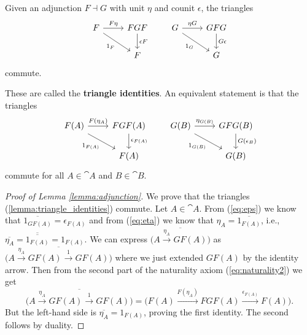 \begin{lemma}\label{lemma:adjunction}
    Given an adjunction $F\dashv G$ with unit $\eta$ and counit $\epsilon$, the triangles
    \begin{equation*}
    \begin{tikzcd}
        F \arrow[r, "F\eta"] \arrow[dr, "1_F"'] & FGF \arrow[d, "\epsilon F"] \\
        & F
    \end{tikzcd}
    \qquad
    \begin{tikzcd}
        G \arrow[r, "\eta G"] \arrow[dr, "1_G"'] & GFG \arrow[d, "G\epsilon"] \\
        & G
    \end{tikzcd}
    \end{equation*}
    commute.
\end{lemma}
\begin{remark}
    These are called the \textbf{triangle identities}. An equivalent statement is that the triangles
    \begin{equation}\label{lemma:triangle_identities}
    \begin{tikzcd}
        F(A) \arrow[r, "F(\eta_A)"] \arrow[dr, "1_{F(A)}"'] & FGF(A) \arrow[d, "\epsilon_{F(A)}"] \\
        & F(A)
    \end{tikzcd}
    \qquad
    \begin{tikzcd}
        G(B) \arrow[r, "\eta_{G(B)}"] \arrow[dr, "1_{G(B)}"'] & GFG(B) \arrow[d, "G(\epsilon_B)"] \\
        & G(B)
    \end{tikzcd}
    \end{equation}
    commute for all $A\in\cat{A}$ and $B\in\cat{B}$.
\end{remark}
\begin{proof}[Proof of Lemma \ref{lemma:adjunction}]
    We prove that the triangles (\ref{lemma:triangle_identities}) commute. Let $A\in\cat{A}$. From (\ref{eq:eps}) we know that $\overline{1_{GF(A)}}=\epsilon_{F(A)}$ and from (\ref{eq:eta}) we know that $\eta_A = \overline{1_{F(A)}}$, i.e., $\overline{\eta_A}=\overline{\overline{1_{F(A)}}}=1_{F(A)}$. We can express $\overline{\big( A\xrightarrow{\eta_A}GF(A)\big)}$ as $\overline{\big( A\xrightarrow{\eta_A} GF(A) \xrightarrow{1} GF(A) \big)}$ where we just extended $GF(A)$ by the identity arrow. Then from the second part of the naturality axiom (\ref{eq:naturality2}) we get
    \begin{equation*}
        \overline{\big( A\xrightarrow{\eta_A} GF(A) \xrightarrow{1} GF(A) \big)} = \big( F(A) \xrightarrow{F(\eta_A)} FGF(A) \xrightarrow{\epsilon_{F(A)}} F(A) \big).
    \end{equation*}
    But the left-hand side is $\overline{\eta_A}=1_{F(A)}$, proving the first identity. The second follows by duality.
\end{proof}

